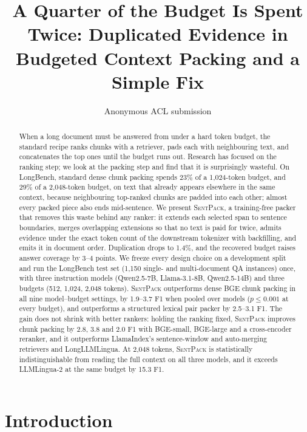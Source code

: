 \documentclass[11pt]{article}
\title{A Quarter of the Budget Is Spent Twice: Duplicated Evidence in\\Budgeted Context Packing and a Simple Fix}
\author{Anonymous ACL submission}
\newcommand{\spk}{\textsc{SentPack}}
\begin{document}
\maketitle

\begin{abstract}
When a long document must be answered from under a hard token budget, the standard recipe ranks chunks with a retriever, pads each with neighbouring text, and concatenates the top ones until the budget runs out. Research has focused on the ranking step; we look at the packing step and find that it is surprisingly wasteful. On LongBench, standard dense chunk packing spends 23\% of a 1,024-token budget, and 29\% of a 2,048-token budget, on text that already appears elsewhere in the same context, because neighbouring top-ranked chunks are padded into each other; almost every packed piece also ends mid-sentence. We present \spk{}, a training-free packer that removes this waste behind any ranker: it extends each selected span to sentence boundaries, merges overlapping extensions so that no text is paid for twice, admits evidence under the exact token count of the downstream tokenizer with backfilling, and emits it in document order. Duplication drops to 1.4\%, and the recovered budget raises answer coverage by 3--4 points. We freeze every design choice on a development split and run the LongBench test set (1,150 single- and multi-document QA instances) once, with three instruction models (Qwen2.5-7B, Llama-3.1-8B, Qwen2.5-14B) and three budgets (512, 1,024, 2,048 tokens). \spk{} outperforms dense BGE chunk packing in all nine model--budget settings, by 1.9--3.7 F1 when pooled over models ($p\le0.001$ at every budget), and outperforms a structured lexical pair packer by 2.5--3.1 F1. The gain does not shrink with better rankers: holding the ranking fixed, \spk{} improves chunk packing by 2.8, 3.8 and 2.0 F1 with BGE-small, BGE-large and a cross-encoder reranker, and it outperforms LlamaIndex's sentence-window and auto-merging retrievers and LongLLMLingua. At 2,048 tokens, \spk{} is statistically indistinguishable from reading the full context on all three models, and it exceeds LLMLingua-2 at the same budget by 15.3 F1.
\end{abstract}

\section{Introduction}
\end{document}
